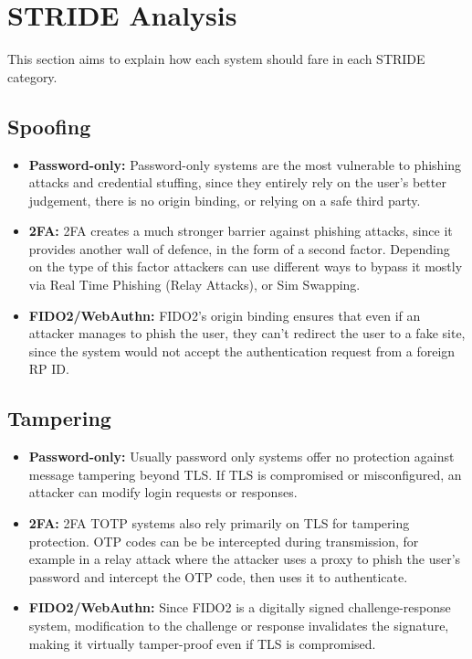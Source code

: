\section{STRIDE Analysis}\label{sec:stride-analysis}
{\small
This section aims to explain how each system should fare in each STRIDE category.
\subsection{Spoofing}
\begin{itemize}[itemsep=0pt, parsep=0pt]
    \item \textbf{Password-only:} Password-only systems are the most vulnerable to phishing attacks and credential stuffing, since they entirely rely on the user's better judgement, there is no origin binding, or relying on a safe third party.
    \item \textbf{2FA:} 2FA creates a much stronger barrier against phishing attacks, since it provides another wall of defence, in the form of a second factor. Depending on the type of this factor attackers can use different ways to bypass it mostly via Real Time Phishing (Relay Attacks), or Sim Swapping.
    \item \textbf{FIDO2/WebAuthn:} FIDO2's origin binding ensures that even if an attacker manages to phish the user, they can't redirect the user to a fake site, since the system would not accept the authentication request from a foreign RP ID.
\end{itemize}

\subsection{Tampering}
\begin{itemize}[itemsep=0pt, parsep=0pt]
    \item \textbf{Password-only:} Usually password only systems offer no protection against message tampering beyond TLS. If TLS is compromised or misconfigured, an attacker can modify login requests or responses.
    \item \textbf{2FA:} 2FA TOTP systems also rely primarily on TLS for tampering protection. OTP codes can be be intercepted during transmission, for example in a relay attack where the attacker uses a proxy to phish the user's password and intercept the OTP code, then uses it to authenticate.
    \item \textbf{FIDO2/WebAuthn:} Since FIDO2 is a digitally signed challenge-response system, modification to the challenge or response invalidates the signature, making it virtually tamper-proof even if TLS is compromised.
\end{itemize}

}

